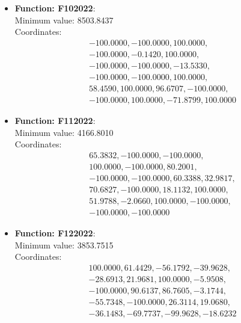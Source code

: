 \documentclass{article}
\begin{document}
\begin{itemize}
  \item \textbf{Function: F102022}: \\
    Minimum value: 8503.8437 \\
    Coordinates:
    \[
      \begin{aligned}
        & -100.0000, -100.0000, 100.0000, \\
        & -100.0000, -0.1420, 100.0000, \\
        & -100.0000, -100.0000, -13.5330, \\
        & -100.0000, -100.0000, 100.0000, \\
        & 58.4590, 100.0000, 96.6707, -100.0000, \\
        & -100.0000, 100.0000, -71.8799, 100.0000
      \end{aligned}
    \]

  \item \textbf{Function: F112022}: \\
    Minimum value: 4166.8010 \\
    Coordinates:
    \[
      \begin{aligned}
        & 65.3832, -100.0000, -100.0000, \\
        & 100.0000, -100.0000, 80.2001, \\
        & -100.0000, -100.0000, 60.3388, 32.9817, \\
        & 70.6827, -100.0000, 18.1132, 100.0000, \\
        & 51.9788, -2.0660, 100.0000, -100.0000, \\
        & -100.0000, -100.0000
      \end{aligned}
    \]

  \item \textbf{Function: F122022}: \\
    Minimum value: 3853.7515 \\
    Coordinates:
    \[
      \begin{aligned}
        & 100.0000, 61.4429, -56.1792, -39.9628, \\
        & -28.6913, 21.9681, 100.0000, -5.9508, \\
        & -100.0000, 90.6137, 86.7605, -3.1744, \\
        & -55.7348, -100.0000, 26.3114, 19.0680, \\
        & -36.1483, -69.7737, -99.9628, -18.6232
      \end{aligned}
    \]

\end{itemize}
\end{document}
